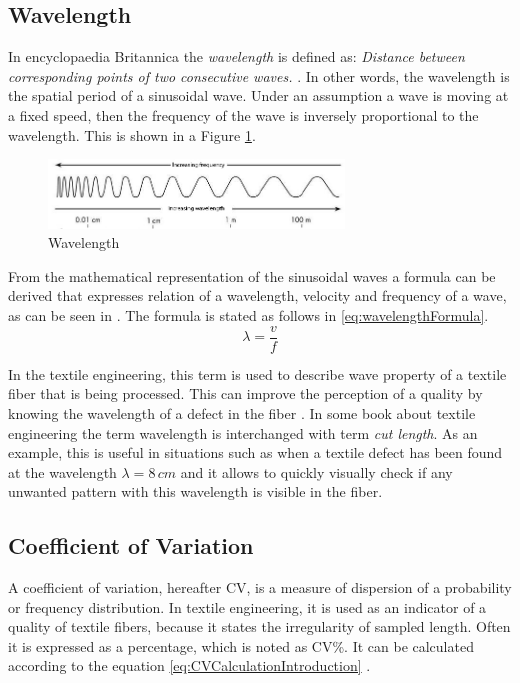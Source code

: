 \documentclass[twoside]{ctuthesis}
\theoremstyle{plain}
\theoremstyle{definition}
\theoremstyle{note}
\begin{document}
\subsection{Wavelength}
In encyclopaedia Britannica the \textit{wavelength} is defined as:
\textit{Distance between corresponding points of two consecutive waves.} \cite{cite:brittanicaWavelength}. In other words, the wavelength is the spatial period of a sinusoidal wave. Under an assumption a wave is moving at a fixed speed, then the frequency of the wave is inversely proportional to the wavelength. This is shown in a Figure \ref{fig:wavelengthExplaination}.
\begin{figure}[h]
	\centering
	\includegraphics[width=0.7\textwidth]{wavelengt_explained.jpg}
	\caption{Wavelength}
	\label{fig:wavelengthExplaination}
\end{figure}

From the mathematical representation of the sinusoidal waves a formula can be derived that expresses relation of a wavelength, velocity and frequency of a wave, as can be seen in \cite{cite:fundamentalsOfPhysics}. The formula is stated as follows in \ref{eq:wavelengthFormula}.
\begin{equation} \label{eq:wavelengthFormula}
\lambda=\frac{v}{f}
\end{equation}

In the textile engineering, this term is used to describe wave property of a textile fiber that is being processed. This can improve the perception of a quality by knowing the wavelength of a defect in the fiber \cite{cite:TextileEngineering}. In some book about textile engineering the term wavelength is interchanged with term \textit{cut length}. As an example, this is useful in situations such as when a textile defect has been found at the wavelength $\lambda=8\,cm$ and it allows to quickly visually check if any unwanted pattern with this wavelength is visible in the fiber.

\subsection{Coefficient of Variation}
\label{sec:CoefficientOfvariation}
A coefficient of variation, hereafter CV, is a measure of dispersion of a probability or frequency distribution. In textile engineering, it is used as an indicator of a quality of textile fibers, because it states the irregularity of sampled length. Often it is expressed as a percentage, which is noted as CV\%. It can be calculated according to the equation \ref{eq:CVCalculationIntroduction} \cite{cite:fundamentalsOfSpunYarn}.
\end{document}
